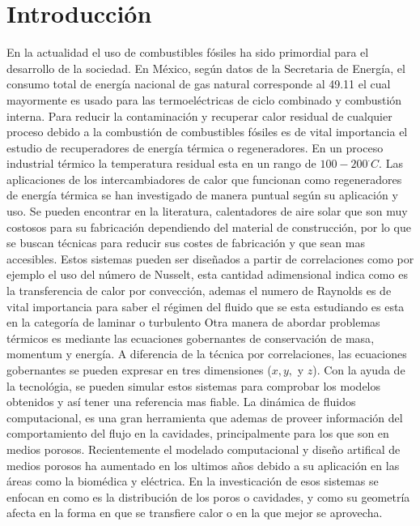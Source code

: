 
\chapter{Introducción}

En la actualidad el uso de combustibles f\'osiles ha sido primordial para el desarrollo de la sociedad. En M\'exico, según datos de la Secretaria de Energ\'ia, el consumo total de energ\'ia nacional de gas natural corresponde al 49.11 el cual mayormente es usado para las termoeléctricas de ciclo combinado y combusti\'on interna\cite{BNE2021}. Para reducir la contaminaci\'on y recuperar calor residual de cualquier proceso debido a la combustión de combustibles fósiles es de vital importancia el estudio de recuperadores de energ\'ia t\'ermica o regeneradores. En un proceso industrial t\'ermico la temperatura residual esta en un rango de $100-200 ^\cdot C$\cite{Anish2021}. 
\newline
Las aplicaciones de los intercambiadores de calor que funcionan como regeneradores de energ\'ia t\'ermica se han investigado de manera puntual según su aplicaci\'on y uso. Se pueden encontrar en la literatura, calentadores de aire solar que son muy costosos para su fabricaci\'on dependiendo del material de construcci\'on, por lo que se buscan técnicas para reducir sus costes de fabricaci\'on y que sean mas accesibles\cite{Abbas2022}.
\newline
Estos sistemas pueden ser dise\~nados a partir de correlaciones como por ejemplo el uso del n\'umero de Nusselt, esta cantidad adimensional indica como es la transferencia de calor por convecci\'on\cite{Pimsarn2022}, ademas el numero de Raynolds es de vital importancia para saber el r\'egimen del fluido que se esta estudiando es esta en la categoría de laminar o turbulento %
\newline
Otra manera de abordar problemas t\'ermicos es mediante las ecuaciones gobernantes de conservaci\'on de masa\cite{Zhao2023}, momentum y energ\'ia. A diferencia de la t\'ecnica por correlaciones, las ecuaciones gobernantes se pueden expresar en tres dimensiones ($x, y,$ y $z$)\cite{Rehman2022}.
Con la ayuda de la tecnol\'ogia, se pueden simular estos sistemas para comprobar los modelos obtenidos y así tener una referencia mas fiable. La din\'amica de fluidos computacional, es una gran herramienta que ademas de proveer informaci\'on del comportamiento del flujo en la cavidades, principalmente para los que son en medios porosos\cite{Prajapati2022}.
\newline
Recientemente el modelado computacional y dise\~no artifical de medios porosos ha aumentado en los ultimos a\~nos debido a su aplicaci\'on en las \'areas como la biom\'edica y el\'ectrica. En la investicaci\'on de esos sistemas se enfocan en como es la distribución de los poros o cavidades, y como su geometría afecta en la forma en que se transfiere calor o en la que mejor se aprovecha\cite{Prajapati2022}.
\newline
